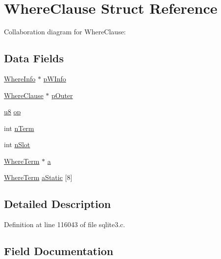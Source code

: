 \hypertarget{struct_where_clause}{}\section{Where\+Clause Struct Reference}
\label{struct_where_clause}


Collaboration diagram for Where\+Clause\+:
\subsection*{Data Fields}
\begin{DoxyCompactItemize}
\item 
\hyperlink{struct_where_info}{Where\+Info} $\ast$ \hyperlink{struct_where_clause_a831ff4750d43c35052a460caacac1bac}{p\+W\+Info}
\item 
\hyperlink{struct_where_clause}{Where\+Clause} $\ast$ \hyperlink{struct_where_clause_aea52862df26541b76c03c923ea2b6ed7}{p\+Outer}
\item 
\hyperlink{sqlite3_8c_a74a0f6424ae628af25f23f0a35f6ead3}{u8} \hyperlink{struct_where_clause_a0991b29aa40e12f033237266ebe6610c}{op}
\item 
int \hyperlink{struct_where_clause_adf762d1d5132698c906bace4882bb1cc}{n\+Term}
\item 
int \hyperlink{struct_where_clause_a85c0e0b1114302d7d4492192bb78025b}{n\+Slot}
\item 
\hyperlink{struct_where_term}{Where\+Term} $\ast$ \hyperlink{struct_where_clause_a1354a36e121d8d62cb85acf49711c092}{a}
\item 
\hyperlink{struct_where_term}{Where\+Term} \hyperlink{struct_where_clause_ad0405ae245a8c0ef140b0313d22e78b8}{a\+Static} \mbox{[}8\mbox{]}
\end{DoxyCompactItemize}


\subsection{Detailed Description}


Definition at line 116043 of file sqlite3.\+c.



\subsection{Field Documentation}
\hypertarget{struct_where_clause_a1354a36e121d8d62cb85acf49711c092}{}

